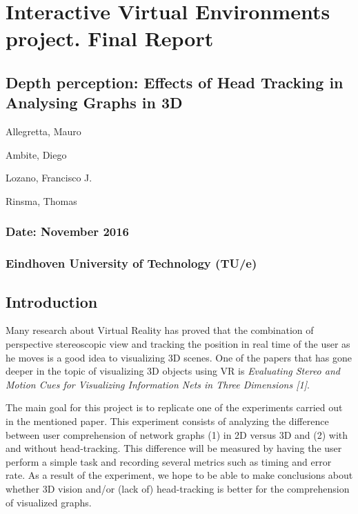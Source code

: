 \section{Interactive Virtual Environments project. Final
Report}\label{interactive-virtual-environments-project.-final-report}

\subsection{Depth perception: Effects of Head Tracking in Analysing
Graphs in
3D}\label{depth-perception-effects-of-head-tracking-in-analysing-graphs-in-3d}

Allegretta, Mauro

Ambite, Diego

Lozano, Francisco J.

Rinsma, Thomas

\subsubsection{Date: November 2016}\label{date-november-2016}

\subsubsection{Eindhoven University of Technology
(TU/e)}\label{eindhoven-university-of-technology-tue}

\subsection{Introduction}\label{introduction}

Many research about Virtual Reality has proved that the combination of
perspective stereoscopic view and tracking the position in real time of
the user as he moves is a good idea to visualizing 3D scenes. One of the
papers that has gone deeper in the topic of visualizing 3D objects using
VR is \emph{Evaluating Stereo and Motion Cues for Visualizing
Information Nets in Three Dimensions {[}1{]}}.

The main goal for this project is to replicate one of the experiments
carried out in the mentioned paper. This experiment consists of
analyzing the difference between user comprehension of network graphs
(1) in 2D versus 3D and (2) with and without head-tracking. This
difference will be measured by having the user perform a simple task and
recording several metrics such as timing and error rate. As a result of
the experiment, we hope to be able to make conclusions about whether 3D
vision and/or (lack of) head-tracking is better for the comprehension of
visualized graphs.

